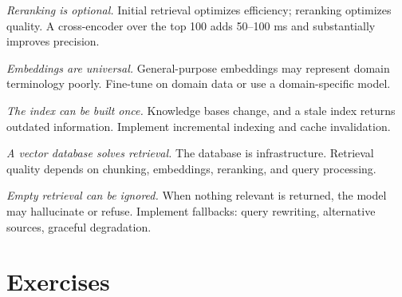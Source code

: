 \documentclass[11pt]{book}
\begin{document}
\textit{Reranking is optional.} Initial retrieval optimizes efficiency; reranking optimizes quality. A cross-encoder over the top 100 adds 50--100 ms and substantially improves precision.

\textit{Embeddings are universal.} General-purpose embeddings may represent domain terminology poorly. Fine-tune on domain data or use a domain-specific model.

\textit{The index can be built once.} Knowledge bases change, and a stale index returns outdated information. Implement incremental indexing and cache invalidation.

\textit{A vector database solves retrieval.} The database is infrastructure. Retrieval quality depends on chunking, embeddings, reranking, and query processing.

\textit{Empty retrieval can be ignored.} When nothing relevant is returned, the model may hallucinate or refuse. Implement fallbacks: query rewriting, alternative sources, graceful degradation.

\section*{Exercises}
\end{document}
